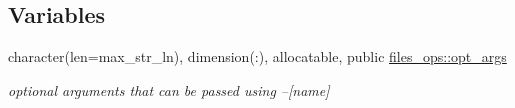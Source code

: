 \subsection*{Variables}
\begin{DoxyCompactItemize}
\item 
character(len=max\+\_\+str\+\_\+ln), dimension(\+:), allocatable, public \hyperlink{namespacefiles__ops_a0666bcbf3aa6a9969e6dc563a40e7152}{files\+\_\+ops\+::opt\+\_\+args}
\begin{DoxyCompactList}\small\item\em optional arguments that can be passed using {\ttfamily --\mbox{[}name\mbox{]}} \end{DoxyCompactList}\end{DoxyCompactItemize}

